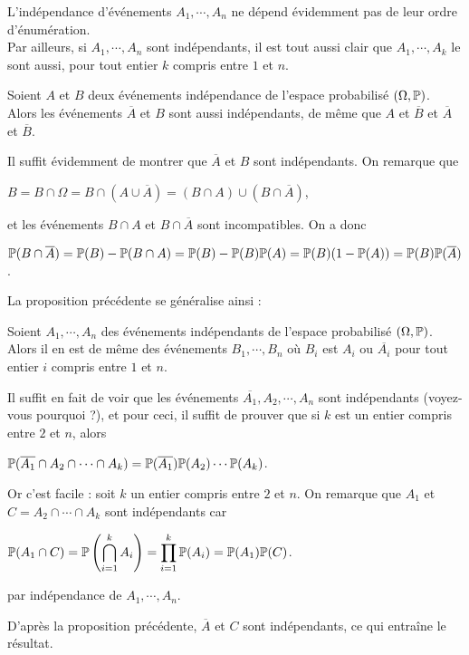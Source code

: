 \documentclass[12pt,a4paper]{report}
\begin{document}
\begin{remarque}{}
L'indépendance d'événements $A_1,\cdots,A_n$ ne dépend évidemment pas de leur ordre d'énumération. \\
Par ailleurs, si $A_1,\cdots,A_n$ sont indépendants, il est tout aussi clair que $A_1,\cdots,A_k$ le sont aussi, pour tout entier $k$ compris entre $1$ et $n$.
\end{remarque}

\begin{proposition}{}{}
Soient $A$ et $B$ deux événements indépendance de l'espace probabilisé $(\Omega, \mathbb{P})$. \\
Alors les événements $\overline{A}$ et $B$ sont aussi indépendants, de même que $A$ et $\overline{B}$ et $\overline{A}$ et $\overline{B}$.
\end{proposition}

\begin{demo}{}
Il suffit évidemment de montrer que $\overline{A}$ et $B$ sont indépendants. On remarque que
\begin{center}
$B = B \cap \Omega = B \cap (A \cup \overline{A}) = (B \cap A) \cup (B \cap \overline{A})$,
\end{center}
et les événements $B \cap A$ et $B \cap \overline{A}$ sont incompatibles. On a donc 
\begin{center}
$\mathbb{P}(B \cap \overline{A}) = \mathbb{P}(B) - \mathbb{P}(B \cap A) = \mathbb{P}(B)-\mathbb{P}(B)\mathbb{P}(A) = \mathbb{P}(B)(1-\mathbb{P}(A)) = \mathbb{P}(B)\mathbb{P}(\overline{A})$. 
\end{center}
\end{demo}

La proposition précédente se généralise ainsi : 
\begin{proposition}{}{}
Soient $A_1,\cdots,A_n$ des événements indépendants de l'espace probabilisé $(\Omega,\mathbb{P})$. Alors il en est de même des événements $B_1,\cdots,B_n$ où $B_i$ est $A_i$ ou $\overline{A_i}$ pour tout entier $i$ compris entre $1$ et $n$.
\end{proposition}

\begin{demo}{}
Il suffit en fait de voir que les événements $\overline{A_1},A_2,\cdots,A_n$ sont indépendants (voyez-vous pourquoi ?), et pour ceci, il suffit de prouver que si $k$ est un entier compris entre $2$ et $n$, alors
\begin{center}
$\mathbb{P}(\overline{A_1} \cap A_2 \cap \cdots \cap A_k) = \mathbb{P}(\overline{A_1}) \mathbb{P}(A_2) \cdots \mathbb{P}(A_k)$.
\end{center}

Or c'est facile : soit $k$ un entier compris entre $2$ et $n$. On remarque que $A_1$ et $C = A_2 \cap \cdots \cap A_k$ sont indépendants car 
\begin{center}
$\mathbb{P}(A_1 \cap C) = \displaystyle \mathbb{P}\left(\bigcap_{i=1}^k A_i\right) = \prod_{i=1}^k \mathbb{P}(A_i) = \mathbb{P}(A_1)\mathbb{P}(C)$.
\end{center}
par indépendance de $A_1,\cdots,A_n$.

D'après la proposition précédente, $\overline{A}$ et $C$ sont indépendants, ce qui entraîne le résultat.
\end{demo}
\end{document}
